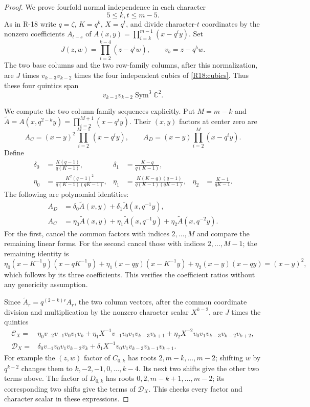 \documentclass[11pt,a4paper]{article}
\theoremstyle{definition}\newtheorem{definition}{Definition}
\begin{document}
\begin{proof}
We prove fourfold normal independence in each character
\begin{equation}\label{R19:interior}
 5\leq k,t\leq m-5.
\end{equation}
As in R-18 write $q=\zeta$, $K=q^k$, $X=q^t$, and
divide character-$t$ coordinates by the nonzero
coefficients $A_{t-s}$ of
$A(x,y)=\prod_{i=k}^{m-1}(x-q^iy)$.
Set
\[
 J(z,w)=\prod_{i=2}^{k-4}(z-q^iw),\qquad
 v_b=z-q^bw.
\]
The two base columns and the two row-family columns,
after this normalization, are $J$ times
$v_{k-3}v_{k-2}$ times the four independent cubics
of \eqref{R18:cubics}. Thus these four quintics span
\begin{equation}\label{R19:rowquintics}
 v_{k-3}v_{k-2}\operatorname{Sym}^3\mathbb C^2.
\end{equation}

We compute the two column-family sequences explicitly.
Put $M=m-k$ and
$\widetilde A=A(x,q^{2-k}y)=\prod_{i=2}^{M+1}(x-q^iy)$.
Their $(x,y)$ factors at center zero are
\[
 A_C=(x-y)^2\prod_{i=2}^{M-1}(x-q^iy),\qquad
 A_D=(x-y)\prod_{i=2}^{M}(x-q^iy).
\]
Define
\[
 \begin{aligned}
 \delta_0&=\frac{K(q-1)}{q(K-1)},&
 \delta_1&=\frac{K-q}{q(K-1)},\\
 \eta_0&=\frac{K^2(q-1)^2}{q(K-1)(qK-1)},&
 \eta_1&=\frac{K(K-q)(q-1)}{q(K-1)(qK-1)},&
 \eta_2&=\frac{K-1}{qK-1}.
 \end{aligned}
\]
The following are polynomial identities:
\[
 \begin{aligned}
 A_D&=\delta_0\widetilde A(x,y)
           +\delta_1\widetilde A(x,q^{-1}y),\\
 A_C&=\eta_0\widetilde A(x,y)
           +\eta_1\widetilde A(x,q^{-1}y)
           +\eta_2\widetilde A(x,q^{-2}y).
 \end{aligned}
\]
For the first, cancel the common factors with indices
$2,\ldots,M$ and compare the remaining linear forms.
For the second cancel those with indices $2,\ldots,M-1$;
the remaining identity is
\[
 \eta_0(x-K^{-1}y)(x-qK^{-1}y)
 +\eta_1(x-qy)(x-K^{-1}y)
 +\eta_2(x-y)(x-qy)=(x-y)^2,
\]
which follows by its three coefficients. This verifies
the coefficient ratios without any genericity assumption.

Since $\widetilde A_r=q^{(2-k)r}A_r$,
the two column vectors, after the common coordinate
division and multiplication by the nonzero character
scalar $X^{k-2}$, are $J$ times the quintics
\begin{align*}
 \mathcal C_X={}&
 \eta_0v_{-2}v_{-1}v_0v_1v_k
 +\eta_1X^{-1}v_{-1}v_0v_1v_{k-3}v_{k+1}
 +\eta_2X^{-2}v_0v_1v_{k-3}v_{k-2}v_{k+2},\\
 \mathcal D_X={}&
 \delta_0v_{-1}v_0v_1v_{k-2}v_k
 +\delta_1X^{-1}v_0v_1v_{k-3}v_{k-1}v_{k+1}.
\end{align*}
For example the $(z,w)$ factor of $C_{0,k}$ has roots
$2,m-k,\ldots,m-2$; shifting $w$ by $q^{k-2}$ changes
them to $k,-2,-1,0,\ldots,k-4$.
Its next two shifts give the other two terms above.
The factor of $D_{0,k}$ has roots
$0,2,m-k+1,\ldots,m-2$; its corresponding two shifts
give the terms of $\mathcal D_X$. This checks every
factor and character scalar in these expressions.


\end{proof}
\end{document}

